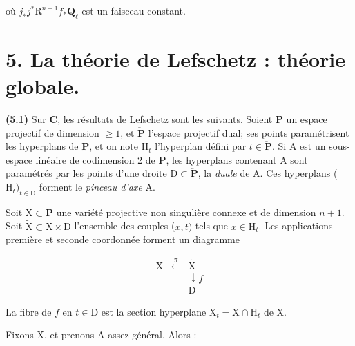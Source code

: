 \documentclass[10pt,leqno]{article}
\begin{document}
\noindent où \(j_{*}j^{*}\mathrm{R}^{n+1}f_{*}\mathbf{Q}_{\ell }\) est un faisceau constant.\par

\section*{5. La théorie de Lefschetz : théorie globale.}

\noindent \textbf{(5.1)} Sur \(\mathbf{C}\), les résultats de Lefschetz sont les suivants. Soient \(\mathbf{P}\) un espace projectif de dimension \(\geq 1\), et \(\check{\mathbf{P}}\) l’espace projectif dual; ses points paramétrisent les hyperplans de \(\mathbf{P}\), et on note \(\mathrm{H}_{t}\) l’hyperplan défini par \(t\in \check{\mathbf{P}}\). Si \(\mathrm{A}\) est un sous-espace linéaire de codimension 2 de \(\mathbf{P}\), les hyperplans contenant \(\mathrm{A}\) sont paramétrés par les points d’une droite \(\mathrm{D}\subset \check{\mathbf{P}}\), la \emph{duale} de \(\mathrm{A}\). Ces hyperplans (\(\mathrm{H}_{t})_{t\in \mathrm{D}}\) forment le \emph{pinceau d’axe} \(\mathrm{A}\).\par

\noindent Soit \(\mathrm{X}\subset \mathbf{P}\) une variété projective non singulière connexe et de dimension \(n+1\). Soit \(\widetilde{\mathrm{X}}\subset \mathrm{X}\times \mathrm{D}\) l’ensemble des couples (\(x,t)\) tels que \(x\in \mathrm{H}_{t}\). Les applications première et seconde coordonnée forment un diagramme\par

\[\begin{array}{ccc}\mathrm X&\xleftarrow{\pi}&\widetilde{\mathrm X}\\ &&\downarrow\!{f}\\ &&\mathrm D\end{array}\tag{5.1.1}\]

\noindent La fibre de \(f\) en \(t\in \mathrm{D}\) est la section hyperplane \(\mathrm{X}_{t}=\mathrm{X}\cap \mathrm{H}_{t}\) de \(\mathrm{X}\).\par{}\thispagestyle{signature37}

\clearpage

\label{physical-19}

\noindent Fixons \(\mathrm{X}\), et prenons \(\mathrm{A}\) assez général. Alors :\par
\end{document}
